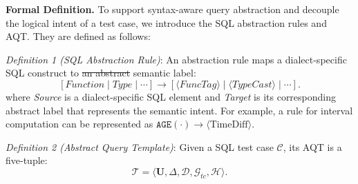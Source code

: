 \documentclass[conference]{IEEEtran}
\makeatletter
\newtheorem{definition}{Definition}
\providecommand{\DIFaddtex}[1]{{\protect\color{blue}\uwave{#1}}} %
\providecommand{\DIFdeltex}[1]{{\protect\color{red}\sout{#1}}} %
\providecommand{\DIFaddbegin}{} %
\providecommand{\DIFaddend}{} %
\providecommand{\DIFdelbegin}{} %
\providecommand{\DIFdelend}{} %
\providecommand{\DIFadd}[1]{\texorpdfstring{\DIFaddtex{#1}}{#1}} %
\providecommand{\DIFdel}[1]{\texorpdfstring{\DIFdeltex{#1}}{}} %
\providecommand{\DIFscaledelfig}{0.5}
\newlength{\DIFdelgraphicswidth} %
\newlength{\DIFdelgraphicsheight} %
\providecommand{\DIFaddincludegraphics}[2][]{{\color{blue}\fbox{\DIFOincludegraphics[#1]{#2}}}} %
\providecommand{\DIFdelincludegraphics}[2][]{%
\sbox{\DIFdelgraphicsbox}{\DIFOincludegraphics[#1]{#2}}%
\settoboxwidth{\DIFdelgraphicswidth}{\DIFdelgraphicsbox} %
\settoboxtotalheight{\DIFdelgraphicsheight}{\DIFdelgraphicsbox} %
\scalebox{\DIFscaledelfig}{%
\parbox[b]{\DIFdelgraphicswidth}{\usebox{\DIFdelgraphicsbox}\\[-\baselineskip] \rule{\DIFdelgraphicswidth}{0em}}\llap{\resizebox{\DIFdelgraphicswidth}{\DIFdelgraphicsheight}{%
\setlength{\unitlength}{\DIFdelgraphicswidth}%
\begin{picture}(1,1)%
\thicklines\linethickness{2pt} %
{\color[rgb]{1,0,0}\put(0,0){\framebox(1,1){}}}%
{\color[rgb]{1,0,0}\put(0,0){\line( 1,1){1}}}%
{\color[rgb]{1,0,0}\put(0,1){\line(1,-1){1}}}%
\end{picture}%
}\hspace*{3pt}}} %
} %
\DeclareRobustCommand{\DIFaddbegin}{\DIFOaddbegin \let\includegraphics\DIFaddincludegraphics} %
\DeclareRobustCommand{\DIFaddend}{\DIFOaddend \let\includegraphics\DIFOincludegraphics} %
\DeclareRobustCommand{\DIFdelbegin}{\DIFOdelbegin \let\includegraphics\DIFdelincludegraphics} %
\DeclareRobustCommand{\DIFdelend}{\DIFOaddend \let\includegraphics\DIFOincludegraphics} %
\let\sout@orig\sout %
\renewcommand{\sout}[1]{\ifmmode\text{\sout@orig{\ensuremath{#1}}}\else\sout@orig{#1}\fi} %
\makeatother
\begin{document}
\textbf{Formal Definition.}
To support syntax-aware query abstraction and decouple the logical intent of a test case, we introduce the SQL abstraction rules and AQT. 
They are defined as follows:

\textit{Definition 1 (SQL Abstraction Rule)}: An abstraction rule maps a dialect-specific SQL construct to \DIFdelbegin \DIFdel{an abstract
}\DIFdelend \DIFaddbegin \DIFadd{a }\DIFaddend semantic label:
\[
    [\textit{Function} \mid \textit{Type} \mid \cdots]
    \rightarrow
    [\langle \textit{FuncTag} \rangle \mid
     \langle \textit{TypeCast} \rangle \mid \cdots].
\]
where \textit{Source} is a dialect-specific SQL element and \textit{Target} is its corresponding abstract label that represents the semantic intent. For example, a rule for interval computation can be represented as $\texttt{AGE}(\cdot) \rightarrow \langle \text{TimeDiff} \rangle$.


\textit{Definition 2 (Abstract Query Template)}: Given a SQL test case $\mathcal{C}$, its AQT is a five-tuple:
\[
    \mathcal{T}=\langle \mathbf{U}, \Delta, \mathcal{D}, \mathcal{G}_{tc}, \mathcal{H} \rangle .
\]
\end{document}
